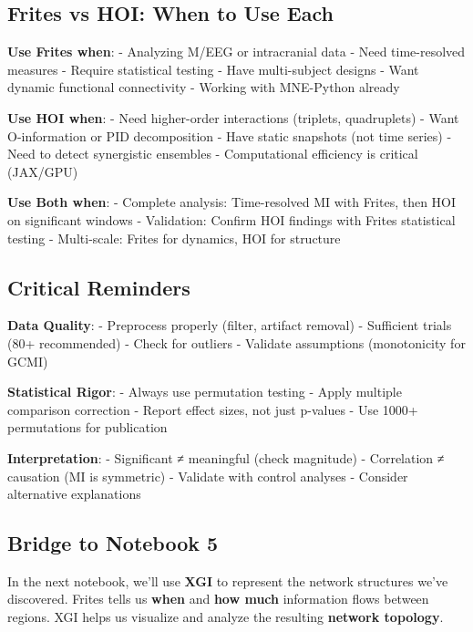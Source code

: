 \documentclass[
  11pt,
  letterpaper,
  oneside,
  openany]{book}
\begin{document}
\subsection{Frites vs HOI: When to Use
Each}\label{frites-vs-hoi-when-to-use-each}

\textbf{Use Frites when}: - Analyzing M/EEG or intracranial data - Need
time-resolved measures - Require statistical testing - Have
multi-subject designs - Want dynamic functional connectivity - Working
with MNE-Python already

\textbf{Use HOI when}: - Need higher-order interactions (triplets,
quadruplets) - Want O-information or PID decomposition - Have static
snapshots (not time series) - Need to detect synergistic ensembles -
Computational efficiency is critical (JAX/GPU)

\textbf{Use Both when}: - Complete analysis: Time-resolved MI with
Frites, then HOI on significant windows - Validation: Confirm HOI
findings with Frites statistical testing - Multi-scale: Frites for
dynamics, HOI for structure

\subsection{Critical Reminders}\label{critical-reminders-1}

\textbf{Data Quality}: - Preprocess properly (filter, artifact removal)
- Sufficient trials (80+ recommended) - Check for outliers - Validate
assumptions (monotonicity for GCMI)

\textbf{Statistical Rigor}: - Always use permutation testing - Apply
multiple comparison correction - Report effect sizes, not just p-values
- Use 1000+ permutations for publication

\textbf{Interpretation}: - Significant ≠ meaningful (check magnitude) -
Correlation ≠ causation (MI is symmetric) - Validate with control
analyses - Consider alternative explanations

\subsection{Bridge to Notebook 5}\label{bridge-to-notebook-5}

In the next notebook, we'll use \textbf{XGI} to represent the network
structures we've discovered. Frites tells us \textbf{when} and
\textbf{how much} information flows between regions. XGI helps us
visualize and analyze the resulting \textbf{network topology}.
\end{document}
